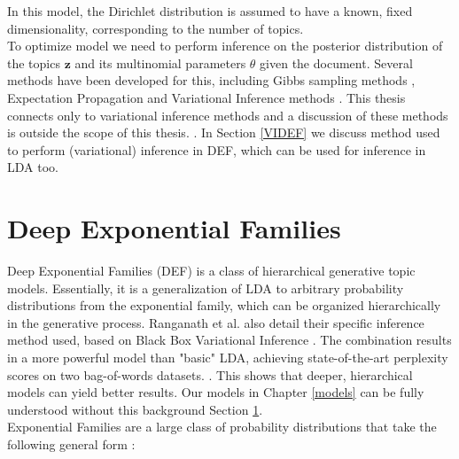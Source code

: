 \documentclass{report}
\begin{document}
In this model, the Dirichlet distribution is assumed to have a known, fixed dimensionality, corresponding to the number of topics.\\
To optimize model we need to perform inference on the posterior distribution of the topics $\mathbf{z}$ and its multinomial parameters $\theta$ given the document. Several methods have been developed for this, including Gibbs sampling methods \cite{griffiths2004finding} \cite{porteous2008fast}, Expectation Propagation \cite{minka2002expectation} and Variational Inference methods \cite{blei2003latent} \cite{teh2006collapsed}. This thesis connects only to variational inference methods and a discussion of these methods is outside the scope of this thesis. . In Section \ref{VIDEF} we discuss method used to perform (variational) inference in DEF, which can be used for inference in LDA too.




		
\section{Deep Exponential Families}\label{DEF}

Deep Exponential Families (DEF) \cite{ranganath2015deep} is a class of hierarchical generative topic models. Essentially, it is a generalization of LDA to arbitrary probability distributions from the exponential family, which can be organized hierarchically in the generative process. Ranganath et al. \cite{ranganath2015deep} also detail their specific inference method used, based on Black Box Variational Inference \cite{ranganath2014black}. The combination results in a more powerful model than "basic" LDA, achieving state-of-the-art perplexity scores on two bag-of-words datasets. \cite{ranganath2015deep}. This shows that deeper, hierarchical models can yield better results. Our models in Chapter \ref{models} can be fully understood without this background Section \ref{DEF}. \\
Exponential Families are a large class of probability distributions that take the following general form \cite{ranganath2015deep}:
\end{document}
